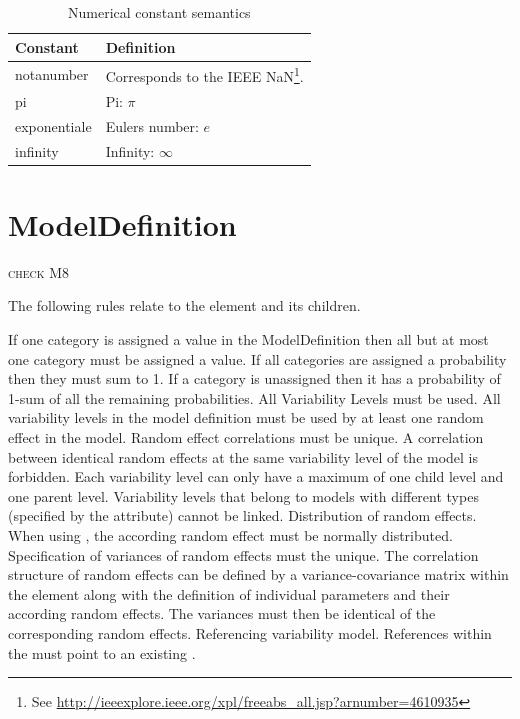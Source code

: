\begin{table}[ht!]
\begin{center}
\small
\begin{tabular}{ll}\toprule
Constant & Definition \\ \midrule
notanumber & Corresponds to the IEEE NaN\footnote{See
  \url{http://ieeexplore.ieee.org/xpl/freeabs_all.jsp?arnumber=4610935}}.\\
pi & Pi: $\pi$\\
exponentiale & Eulers number: $e$\\
infinity & Infinity: $\infty$\\\bottomrule
\end{tabular}
\end{center}
\caption{Numerical constant semantics}
\label{tab:numerical-const-semantics}
\end{table}%


\section{ModelDefinition}
{\color{red} \scshape{check M8}}

The following rules relate to the  element and
its children.

\begin{valrules}
If one category is assigned a value in the ModelDefinition then all
but at most one category must be assigned a
value.
If all categories are assigned a probability then they must sum to 1. If a category is 
unassigned then it has a probability of 1-sum of all the remaining probabilities. 
 {All Variability Levels must be used.} All variability
levels in the model definition must be used by at least one random
effect in the model.
 {Random effect correlations must be unique.} A
correlation between identical random effects at the same variability
level of the model is forbidden.
 Each variability level can only have a maximum of one child
level and one parent level. Variability levels that belong to models
with different types (specified by the  attribute) cannot
be linked.
 {Distribution of random effects.} When using , 
the according random effect must be normally distributed.
 {Specification of variances of random effects must the unique.} 
The correlation structure of random effects can be defined by a variance-covariance 
matrix within the  element along with the definition of individual
parameters and their according random effects.
The variances must then be identical of the corresponding random effects.
 {Referencing variability model.} References within the 
 must point to an existing .
\end{valrules}

